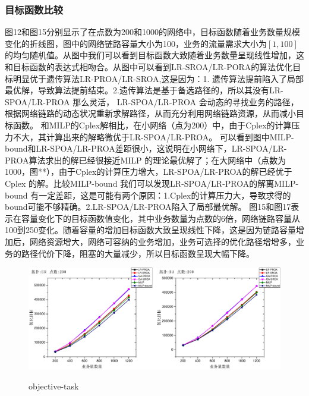  \subsubsection{目标函数比较}
 图12和图15分别显示了在点数为200和1000的网络中，目标函数随着业务数量规模变化的折线图，图中的网络链路容量大小为100，业务的流量需求大小为$[1,100]$的均匀随机值。从图中我们可以看到目标函数大致随着业务数量呈现线性增加，这和目标函数的表达式相吻合。从图中可以看到LR-SROA/LR-PORA的算法优化目标明显优于遗传算法LR-PROA/LR-SROA,这是因为：1. 遗传算法提前陷入了局部最优解，导致算法提前结束。2.遗传算法是基于备选路径的，所以其没有LR-SPOA/LR-PROA 那么灵活， LR-SPOA/LR-PROA 会动态的寻找业务的路径，根据网络链路的动态状况重新求解路径，从而充分利用网络链路资源，从而减小目标函数。
 和MILP的Cplex解相比，在小网络（点为200）中，由于Cplex的计算压力不大，其计算出来的解略微优于LR-SPOA/LR-PROA。
 可以看到图中MILP-bound和LR-SPOA/LR-PROA差距很小，这说明在小网络下，LR-SPOA/LR-PROA算法求出的解已经很接近MILP 的理论最优解了；在大网络中（点数为1000，图**），由于Cplex的计算压力增大，LR-SPOA/LR-PROA的解已经优于Cplex 的解。比较MILP-bound 我们可以发现LR-SPOA/LR-PROA的解离MILP-bound 有一定差距，这是可能有两个原因：1.Cplex的计算压力大，导致求得的bound可能不够精确。2.LR-SPOA/LR-PROA陷入了局部最优解。
  图15和图17表示在容量变化下的目标函数值变化，其中业务数量为点数的6倍，网络链路容量从100到250变化。随着容量的增加目标函数大致呈现线性下降，这是因为链路容量增加后，网络资源增大，网络可容纳的业务增加，业务可选择的优化路径增增多，业务的路径代价下降，阻塞的大量减少，所以目标函数呈现大幅下降。
\begin{figure}
\setlength{\belowcaptionskip}{-0.1cm}
  \begin{center}
    {\includegraphics[width=1 \textwidth]{figures/OB-TA-200.pdf}}
    \end{center}
  \caption{{\footnotesize{objective-task}}}
  \label{IterNum}
\end{figure}
